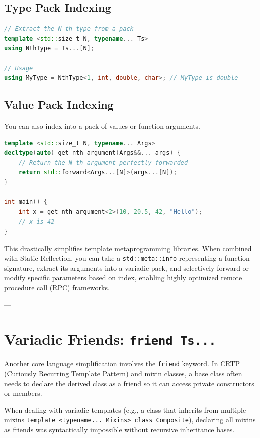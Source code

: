 \subsection{Type Pack Indexing}

\begin{lstlisting}[language=C++]
// Extract the N-th type from a pack
template <std::size_t N, typename... Ts>
using NthType = Ts...[N];

// Usage
using MyType = NthType<1, int, double, char>; // MyType is double
\end{lstlisting}

\subsection{Value Pack Indexing}

You can also index into a pack of values or function arguments.

\begin{lstlisting}[language=C++]
template <std::size_t N, typename... Args>
decltype(auto) get_nth_argument(Args&&... args) {
    // Return the N-th argument perfectly forwarded
    return std::forward<Args...[N]>(args...[N]);
}

int main() {
    int x = get_nth_argument<2>(10, 20.5, 42, "Hello");
    // x is 42
}
\end{lstlisting}

This drastically simplifies template metaprogramming libraries. When combined with Static Reflection, you can take a \texttt{std::meta::info} representing a function signature, extract its arguments into a variadic pack, and selectively forward or modify specific parameters based on index, enabling highly optimized remote procedure call (RPC) frameworks.

---

\section{Variadic Friends: \texttt{friend Ts...}}

Another core language simplification involves the \texttt{friend} keyword. In CRTP (Curiously Recurring Template Pattern) and mixin classes, a base class often needs to declare the derived class as a friend so it can access private constructors or members.

When dealing with variadic templates (e.g., a class that inherits from multiple mixins \texttt{template <typename... Mixins> class Composite}), declaring all mixins as friends was syntactically impossible without recursive inheritance bases.

